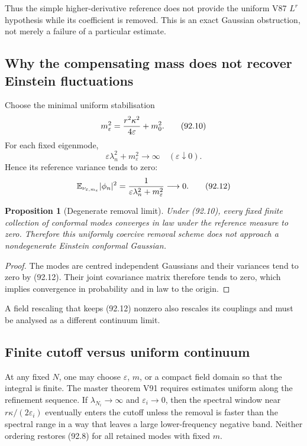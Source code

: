 \documentclass[11pt]{article}
\newtheorem{proposition}[theorem]{Proposition}
\begin{document}
Thus the simple higher-derivative reference does not provide the
uniform V87 \(L^r\) hypothesis while its coefficient is removed.
This is an exact Gaussian obstruction, not merely a failure of a
particular estimate.

\subsection{Why the compensating mass does not recover Einstein
fluctuations}

Choose the minimal uniform stabilisation
\[
                         m_\varepsilon^2
 ={r^2\kappa^2\over4\varepsilon}+m_0^2.                     \tag{92.10}
\]
For each fixed eigenmode,
\[
 \varepsilon\lambda_n^2+m_\varepsilon^2
                         \longrightarrow\infty
                    \quad(\varepsilon\downarrow0).          \tag{92.11}
\]
Hence its reference variance tends to zero:
\[
 \mathbb E_{\nu_{\varepsilon,m_\varepsilon}}
                              |\phi_n|^2
 ={1\over\varepsilon\lambda_n^2+m_\varepsilon^2}
                         \longrightarrow0.                  \tag{92.12}
\]

\begin{proposition}[Degenerate removal limit]
\label{prop:v11v92-degenerate}
Under (92.10), every fixed finite collection of conformal modes
converges in law under the reference measure to zero.  Therefore this
uniformly coercive removal scheme does not approach a nondegenerate
Einstein conformal Gaussian.
\end{proposition}

\begin{proof}
The modes are centred independent Gaussians and their variances tend
to zero by (92.12).  Their joint covariance matrix therefore tends to
zero, which implies convergence in probability and in law to the
origin.
\end{proof}

A field rescaling that keeps (92.12) nonzero also rescales its
couplings and must be analysed as a different continuum limit.

\subsection{Finite cutoff versus uniform continuum}

At any fixed \(N\), one may choose \(\varepsilon\), \(m\), or a compact
field domain so that the integral is finite.  The master theorem V91
requires estimates uniform along the refinement sequence.  If
\(\lambda_{N_i}\to\infty\) and \(\varepsilon_i\to0\), then the spectral
window near \(r\kappa/(2\varepsilon_i)\) eventually enters the cutoff
unless the removal is faster than the spectral range in a way that
leaves a large lower-frequency negative band.  Neither ordering
restores (92.8) for all retained modes with fixed \(m\).
\end{document}
